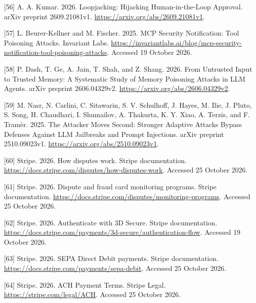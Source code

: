 \documentclass[acmlarge,nonacm]{acmart}
\newlength{\cslhangindent}
\newlength{\cslentryspacingunit} %
\newenvironment{CSLReferences}[2] %
 {\bibliofont %
  \setlength{\parindent}{0pt}
  \ifodd #1
  \let\oldpar\par
  \def\par{\hangindent=\cslhangindent\oldpar}
  \fi
  \setlength{\parskip}{#2\cslentryspacingunit}
 }%
 {}
\begin{document}
\begin{CSLReferences}{1}{1}
\leavevmode{}%
{[}56{]} A. A. Kumar. 2026. Loopjacking: Hijacking Human-in-the-Loop
Approval. arXiv preprint 2609.21081v1.
\url{https://arxiv.org/abs/2609.21081v1}.

\leavevmode{}%
{[}57{]} L. Beurer-Kellner and M. Fischer. 2025. MCP Security
Notification: Tool Poisoning Attacks. Invariant Labs.
\url{https://invariantlabs.ai/blog/mcp-security-notification-tool-poisoning-attacks}.
Accessed 19 October 2026.

\leavevmode{}%
{[}58{]} P. Dash, T. Ge, A. Jain, T. Shah, and Z. Shang. 2026. From
Untrusted Input to Trusted Memory: A Systematic Study of Memory
Poisoning Attacks in LLM Agents. arXiv preprint 2606.04329v2.
\url{https://arxiv.org/abs/2606.04329v2}.

\leavevmode{}%
{[}59{]} M. Nasr, N. Carlini, C. Sitawarin, S. V. Schulhoff, J. Hayes,
M. Ilie, J. Pluto, S. Song, H. Chaudhari, I. Shumailov, A. Thakurta, K.
Y. Xiao, A. Terzis, and F. Tramèr. 2025. The Attacker Moves Second:
Stronger Adaptive Attacks Bypass Defenses Against LLM Jailbreaks and
Prompt Injections. arXiv preprint 2510.09023v1.
\url{https://arxiv.org/abs/2510.09023v1}.

\leavevmode{}%
{[}60{]} Stripe. 2026. How disputes work. Stripe documentation.
\url{https://docs.stripe.com/disputes/how-disputes-work}. Accessed 25
October 2026.

\leavevmode{}%
{[}61{]} Stripe. 2026. Dispute and fraud card monitoring programs.
Stripe documentation.
\url{https://docs.stripe.com/disputes/monitoring-programs}. Accessed 25
October 2026.

\leavevmode{}%
{[}62{]} Stripe. 2026. Authenticate with 3D Secure. Stripe
documentation.
\url{https://docs.stripe.com/payments/3d-secure/authentication-flow}.
Accessed 19 October 2026.

\leavevmode{}%
{[}63{]} Stripe. 2026. SEPA Direct Debit payments. Stripe documentation.
\url{https://docs.stripe.com/payments/sepa-debit}. Accessed 25 October
2026.

\leavevmode{}%
{[}64{]} Stripe. 2026. ACH Payment Terms. Stripe Legal.
\url{https://stripe.com/legal/ACH}. Accessed 25 October 2026.


\end{CSLReferences}
\end{document}
